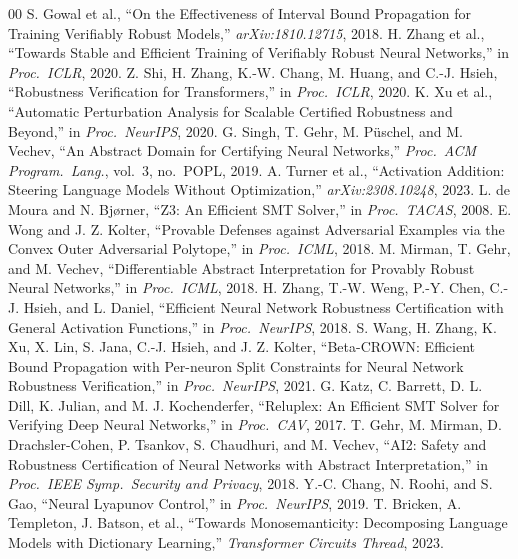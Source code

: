 \documentclass[10pt,journal]{IEEEtran}
\begin{document}
\begin{thebibliography}{00}
 S. Gowal et al., ``On the Effectiveness of Interval Bound Propagation for Training Verifiably Robust Models,'' \emph{arXiv:1810.12715}, 2018.
 H. Zhang et al., ``Towards Stable and Efficient Training of Verifiably Robust Neural Networks,'' in \emph{Proc.\ ICLR}, 2020.
 Z. Shi, H. Zhang, K.-W. Chang, M. Huang, and C.-J. Hsieh, ``Robustness Verification for Transformers,'' in \emph{Proc.\ ICLR}, 2020.
 K. Xu et al., ``Automatic Perturbation Analysis for Scalable Certified Robustness and Beyond,'' in \emph{Proc.\ NeurIPS}, 2020.
 G. Singh, T. Gehr, M. P{\"u}schel, and M. Vechev, ``An Abstract Domain for Certifying Neural Networks,'' \emph{Proc.\ ACM Program.\ Lang.}, vol.\ 3, no.\ POPL, 2019.
 A. Turner et al., ``Activation Addition: Steering Language Models Without Optimization,'' \emph{arXiv:2308.10248}, 2023.
 L. de Moura and N. Bj{\o}rner, ``Z3: An Efficient SMT Solver,'' in \emph{Proc.\ TACAS}, 2008.
 E. Wong and J. Z. Kolter, ``Provable Defenses against Adversarial Examples via the Convex Outer Adversarial Polytope,'' in \emph{Proc.\ ICML}, 2018.
 M. Mirman, T. Gehr, and M. Vechev, ``Differentiable Abstract Interpretation for Provably Robust Neural Networks,'' in \emph{Proc.\ ICML}, 2018.
 H. Zhang, T.-W. Weng, P.-Y. Chen, C.-J. Hsieh, and L. Daniel, ``Efficient Neural Network Robustness Certification with General Activation Functions,'' in \emph{Proc.\ NeurIPS}, 2018.
 S. Wang, H. Zhang, K. Xu, X. Lin, S. Jana, C.-J. Hsieh, and J. Z. Kolter, ``Beta-CROWN: Efficient Bound Propagation with Per-neuron Split Constraints for Neural Network Robustness Verification,'' in \emph{Proc.\ NeurIPS}, 2021.
 G. Katz, C. Barrett, D. L. Dill, K. Julian, and M. J. Kochenderfer, ``Reluplex: An Efficient SMT Solver for Verifying Deep Neural Networks,'' in \emph{Proc.\ CAV}, 2017.
 T. Gehr, M. Mirman, D. Drachsler-Cohen, P. Tsankov, S. Chaudhuri, and M. Vechev, ``AI2: Safety and Robustness Certification of Neural Networks with Abstract Interpretation,'' in \emph{Proc.\ IEEE Symp.\ Security and Privacy}, 2018.
 Y.-C. Chang, N. Roohi, and S. Gao, ``Neural Lyapunov Control,'' in \emph{Proc.\ NeurIPS}, 2019.
 T. Bricken, A. Templeton, J. Batson, et al., ``Towards Monosemanticity: Decomposing Language Models with Dictionary Learning,'' \emph{Transformer Circuits Thread}, 2023.
\end{thebibliography}
\end{document}
